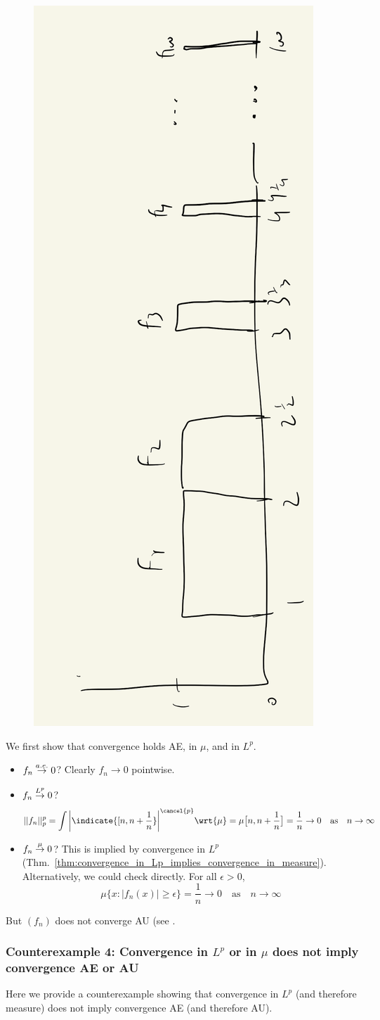 \documentclass{article} %
\begin{document}
\begin{figure}[H]
\centering
\includegraphics[width=.25\textwidth, angle=270]{images/modes_of_convergence_counter_example_3}	
\caption{}
\label{fig:modes_of_convergence_counter_example_3}	
\end{figure}

We first show that convergence holds AE, in $\mu$, and in $L^p$.
\begin{itemize}
\item $f_n \stackrel{a.e.}{\to} 0$? \greencheck  Clearly $f_n \to 0$ pointwise.	
\item $f_n \stackrel{L^p}{\to} 0$? \greencheck  
\[ ||f_n||_p^p = \int \bigg| \indicate{[n, n + \frac{1}{n}} \bigg|^{\cancel{p}} \wrt{\mu} = \mu\big[n , n+\frac{1}{n}\big] = \frac{1}{n} \to 0 \quad \text{as} \quad n \to \infty\]
\item $f_n \stackrel{\mu}{\to} 0$? \greencheck This is implied by convergence in $L^p$ (Thm.~\ref{thm:convergence_in_Lp_implies_convergence_in_measure}).  Alternatively, we could check directly. For all $\epsilon >0$,
\[ \mu \big\{ x : |f_n(x)| \geq \epsilon \big\} = \frac{1}{n} \to 0 \quad \text{as} \quad n \to \infty \]  
\end{itemize}

But $(f_n)$ does not converge AU (see \cite[pp.99]{ash2000probability}.
 

\subsubsection{Counterexample 4: Convergence in $L^p$ or in $\mu$ does not imply convergence  AE or AU}


Here we provide a counterexample showing that convergence in $L^p$ (and therefore measure) does not imply convergence AE (and therefore AU).
\end{document}
